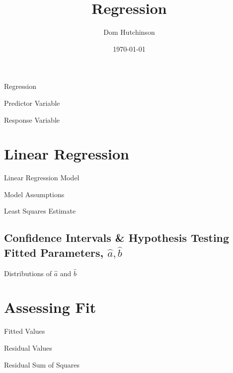 \documentclass[11pt,a4paper]{article}
\begin{document}
\title{Regression}
\author{Dom Hutchinson}
\date{\today}
\maketitle

\begin{definition}{Regression}

\end{definition}

\begin{definition}{Predictor Variable}

\end{definition}

\begin{definition}{Response Variable}

\end{definition}

\section{Linear Regression}

\begin{definition}{Linear Regression Model}

\end{definition}

\begin{remark}{Model Assumptions}

\end{remark}

\begin{definition}{Least Squares Estimate}

\end{definition}

\subsection{Confidence Intervals \& Hypothesis Testing Fitted Parameters, $\hat{a},\hat{b}$}

\begin{proposition}{Distributions of $\hat{a}$ and $\hat{b}$}

\end{proposition}

\section{Assessing Fit}

\begin{definition}{Fitted Values}

\end{definition}

\begin{definition}{Residual Values}

\end{definition}

\begin{definition}{Residual Sum of Squares}
\end{definition}
\end{document}
